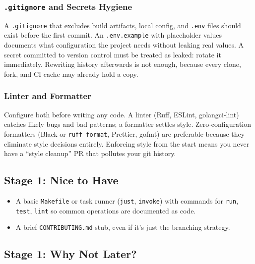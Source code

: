 \subsubsection*{\texorpdfstring{\texttt{.gitignore} and Secrets Hygiene}{.gitignore and Secrets Hygiene}}\label{writing-good-code:gitignore-and-secrets-hygiene}

A \texttt{.gitignore} that excludes build artifacts, local config, and \texttt{.env} files should exist before the first commit. An \texttt{.env.example} with placeholder values documents what configuration the project needs without leaking real values. A secret committed to version control must be treated as leaked: rotate it immediately. Rewriting history afterwards is not enough, because every clone, fork, and CI cache may already hold a copy.

\subsubsection*{Linter and Formatter}\label{writing-good-code:linter-and-formatter}

Configure both before writing any code. A linter (Ruff, ESLint, golangci-lint) catches likely bugs and bad patterns; a formatter settles style. Zero-configuration formatters (Black or \texttt{ruff\ format}, Prettier, gofmt) are preferable because they eliminate style decisions entirely. Enforcing style from the start means you never have a ``style cleanup'' PR that pollutes your git history.

\subsection*{Stage 1: Nice to Have}\label{writing-good-code:stage-1-nice-to-have}

\begin{itemize}
\tightlist
\item
  A basic \texttt{Makefile} or task runner (\texttt{just}, \texttt{invoke}) with commands for \texttt{run}, \texttt{test}, \texttt{lint} so common operations are documented as code.
\item
  A brief \texttt{CONTRIBUTING.md} stub, even if it's just the branching strategy.
\end{itemize}

\subsection*{Stage 1: Why Not Later?}\label{writing-good-code:stage-1-why-not-later}


